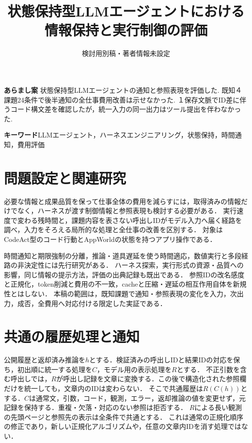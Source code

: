 \documentclass[uplatex,a4paper,twocolumn,10pt]{jsarticle}
\title{状態保持型LLMエージェントにおける\newline 情報保持と実行制御の評価}
\author{検討用別稿・著者情報未設定}
\date{}
\begin{document}
\raggedbottom
\maketitle
\noindent\textbf{あらまし案}\quad
状態保持型LLMエージェントの通知と参照表現を評価した. 既知４課題24条件で後半通知の全仕事費用改善は示せなかった. １保存文脈でID差に伴うコード構文差を確認したが，統一入力の同一出力はツール提出を伴わなかった.

\noindent\textbf{キーワード}\quad LLMエージェント，ハーネスエンジニアリング，状態保持，時間通知，費用評価

\section{問題設定と関連研究}
必要な情報と成果品質を保って仕事全体の費用を減らすには，取得済みの情報だけでなく，ハーネスが渡す制御情報と参照表現も検討する必要がある．
実行速度で変わる残時間と，課題内容を表さない呼出しIDがモデル入力へ届く経路を調べ，入力をそろえる局所的な処理と全仕事の改善を区別する．
対象はCodeAct\cite{codeact}型のコード行動とAppWorld\cite{appworld}の状態を持つアプリ操作である．

時間通知と期限強制の分離\cite{clock}，推論・道具遅延を使う時間適応\cite{timely}，数値実行と多段経路の非決定性\cite{nondeterminism,consistency}には先行研究がある．
ハーネス探索\cite{beyondprompts}，実行形式の資源・品質への影響\cite{localprotocol}，同じ情報の提示方法\cite{delivery}，評価の出典記録\cite{repro}も既出である．
参照IDの改名感度と正規化\cite{canonical}，token削減と費用の不一致\cite{costproxy}，cacheと圧縮・遅延の相互作用\cite{capc,cacheeval}自体を新規性とはしない．
本稿の範囲は，既知課題で通知・参照表現の変化を入力，次出力，成否，全費用へ対応付ける限定した実証である．

\section{共通の履歴処理と通知}
公開履歴と返却済み推論を$h$とする．検証済みの呼出しIDと結果IDの対応を保ち，初出順に統一する処理を$C$，モデル用の表示処理を$R$とする．
不正引数を含む呼出しでは，$R$が呼出し記録を文章に変換する．この後で構造化された参照欄だけを統一しても，文章内のIDは変わらない．
そこで共通履歴は$R(C(h))$とする．$C$は通常文，引数，コード，観測，エラー，返却推論の値を変更せず，元記録を保持する．重複・欠落・対応のない参照は拒否する．
$R$による長い観測の先頭ページと参照先の表示は全条件で共通とする．
これは通常の正規化順序の修正であり，新しい正規化アルゴリズムや，任意の文章内IDを消す処理ではない．
\end{document}
